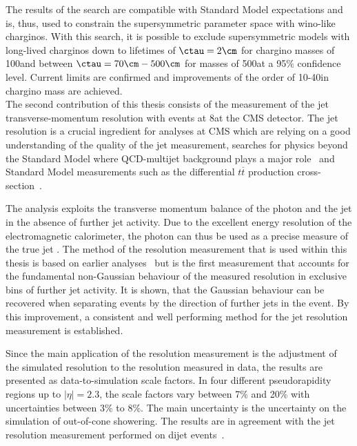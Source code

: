 The results of the search are compatible with Standard Model expectations and is, thus, used to constrain the supersymmetric parameter space with wino-like charginos.
With this search, it is possible to exclude supersymmetric models with long-lived charginos down to lifetimes of $\ctau = 2\cm$ for chargino masses of 100\gev and between $\ctau = 70\cm- 500\cm$ for masses of 500\gev at a 95\% confidence level.
Current limits are confirmed and improvements of the order of 10-40\gev in chargino mass are achieved.\\

The second contribution of this thesis consists of the measurement of the jet transverse-momentum resolution with \GAMJET events at 8\tev at the CMS detector.
The jet \pt resolution is a crucial ingredient for analyses at CMS which are relying on a good understanding of the quality of the jet \pt measurement, \eg searches for physics beyond the Standard Model where QCD-multijet background plays a major role~\cite{bib:CMS:RA2_8TeV,bib:CMS:MT2_8TeV,bib:CMS:AlphaT_8TeV} and Standard Model measurements such as the differential $t\overline{t}$ production cross-section~\cite{bib:CMS:TopCrossSection_8TeV}.

The analysis exploits the transverse momentum balance of the photon and the jet in the absence of further jet activity.
Due to the excellent energy resolution of the electromagnetic calorimeter, the photon \pt can thus be used as a precise measure of the true jet \pt.
The method of the resolution measurement that is used within this thesis is based on earlier analyses~\cite{bib:CMS:JERCPaper_2011,CMS:PAS:JETResolution_7TeV} but is the first measurement that accounts for the fundamental non-Gaussian behaviour of the measured resolution in exclusive bins of further jet activity.
It is shown, that the Gaussian behaviour can be recovered when separating events by the direction of further jets in the event.
By this improvement, a consistent and well performing method for the jet \pt resolution measurement is established.

Since the main application of the resolution measurement is the adjustment of the simulated resolution to the resolution measured in data, the results are presented as data-to-simulation scale factors.
In four different pseudorapidity regions up to $|\eta|=2.3$, the scale factors vary between 7\% and 20\% with uncertainties between 3\% to 8\%.
The main uncertainty is the uncertainty on the simulation of out-of-cone showering.
The results are in agreement with the jet \pt resolution measurement performed on dijet events~\cite{bib:Kristin_Thesis}.\\

